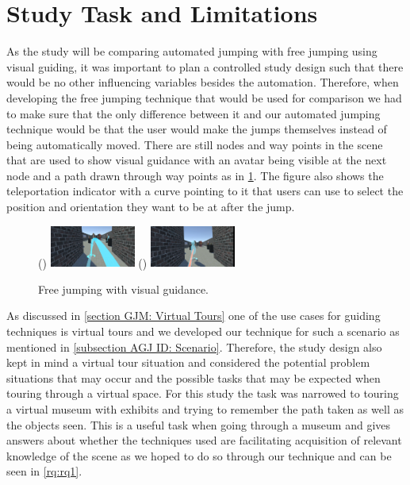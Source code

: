 \section{Study Task and Limitations}
\label{section DPUS: Study Task and Limitations}
As the study will be comparing automated jumping with free jumping using visual guiding, it was important to plan a controlled study design such that there would be no other influencing variables besides the automation. Therefore, when developing the free jumping technique that would be used for comparison we had to make sure that the only difference between it and our automated jumping technique would be that the user would make the jumps themselves instead of being automatically moved. There are still nodes and way points in the scene that are used to show visual guidance with an avatar being visible at the next node and a path drawn through way points as in \cref{fig:study-free-jumping}. The figure also shows the teleportation indicator with a curve pointing to it that users can use to select the position and orientation they want to be at after the jump.

\begin{figure}[]
	()
	\includegraphics[width=0.25\textwidth]{images/free-jumping.pdf}
	()
	\includegraphics[width=0.25\textwidth]{images/automated-jumping.pdf}
	\caption{Free jumping with visual guidance.}
	\label{fig:study-free-jumping}
\end{figure}

As discussed in \cref{section GJM: Virtual Tours} one of the use cases for guiding techniques is virtual tours and we developed our technique for such a scenario as mentioned in \cref{subsection AGJ ID: Scenario}. Therefore, the study design also kept in mind a virtual tour situation and considered the potential problem situations that may occur and the possible tasks that may be expected when touring through a virtual space. For this study the task was narrowed to touring a virtual museum with exhibits and trying to remember the path taken as well as the objects seen. This is a useful task when going through a museum and gives answers about whether the techniques used are facilitating acquisition of relevant knowledge of the scene as we hoped to do so through our technique and can be seen in \cref{rq:rq1}.

